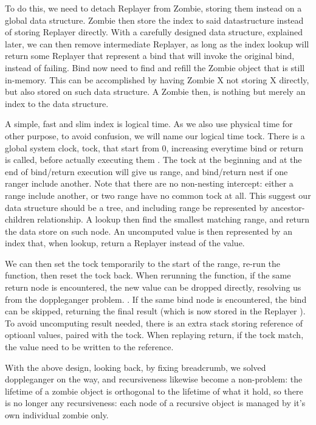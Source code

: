 To do this, we need to detach Replayer from Zombie, storing them instead on a global data structure. Zombie then store the index to said datastructure instead of storing Replayer directly. With a carefully designed data structure, explained later, we can then remove intermediate Replayer, as long as the index lookup will return some Replayer that represent a bind that will invoke the original bind, instead of failing. Bind now need to find and refill the Zombie object that is still in-memory. This can be accomplished by having Zombie X not storing X directly, but also stored on such data structure. A Zombie then, is nothing but merely an index to the data structure.

A simple, fast and slim index is logical time. As we also use physical time for other purpose, to avoid confusion, we will name our logical time tock. There is a global system clock, tock, that start from 0, increasing everytime bind or return is called, before actually executing them . The tock at the beginning and at the end of bind/return execution will give us range, and bind/return nest if one ranger include another. Note that there are no non-nesting intercept: either a range include another, or two range have no common tock at all. This suggest our data structure should be a tree, and including range be represented by ancestor-children relationship. A lookup then find the smallest matching range, and return the data store on such node. An uncomputed value is then represented by an index that, when lookup, return a Replayer instead of the value.

We can then set the tock temporarily to the start of the range, re-run the function, then reset the tock back. When rerunning the function, if the same return node is encountered, the new value can be dropped directly, resolving us from the doppleganger problem. . If the same bind node is encountered, the bind can be skipped, returning the final result (which is now stored in the Replayer ). To avoid uncomputing result needed, there is an extra stack storing reference of optioanl values, paired with the tock. When replaying return, if the tock match, the value need to be written to the reference.

With the above design, looking back, by fixing breadcrumb, we solved doppleganger on the way, and recursiveness likewise become a non-problem: the lifetime of a zombie object is orthogonal to the lifetime of what it hold, so there is no longer any recursiveness: each node of a recursive object is managed by it's own individual zombie only.
